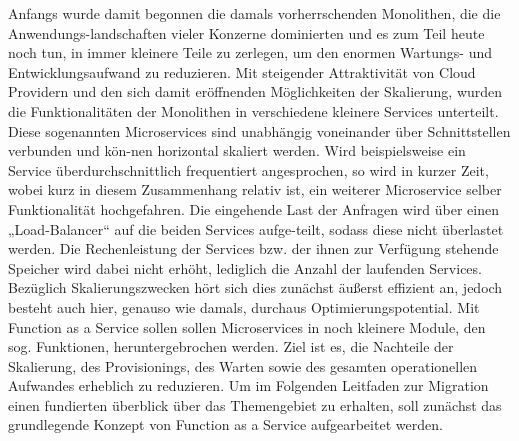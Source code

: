 \documentclass[a4paper,twoside,11pt, pagesize]{scrartcl}
\begin{document}
\begin{spacing}{1.2}
Anfangs wurde damit begonnen die damals vorherrschenden Monolithen, die die Anwendungs-landschaften vieler Konzerne dominierten und es zum Teil heute noch tun, in immer kleinere Teile zu zerlegen, um den enormen Wartungs- und Entwicklungsaufwand zu reduzieren. Mit steigender Attraktivität von Cloud Providern und den sich damit eröffnenden Möglichkeiten der Skalierung, wurden die Funktionalitäten der Monolithen in verschiedene kleinere Services unterteilt. Diese sogenannten Microservices sind unabhängig voneinander über Schnittstellen verbunden und kön-nen horizontal skaliert werden. Wird beispielsweise ein Service überdurchschnittlich frequentiert angesprochen, so wird in kurzer Zeit, wobei kurz in diesem Zusammenhang relativ ist, ein weiterer Microservice selber Funktionalität hochgefahren. Die eingehende Last der Anfragen wird über einen „Load-Balancer“ auf die beiden Services aufge-teilt, sodass diese nicht überlastet werden. Die Rechenleistung der Services bzw. der ihnen zur Verfügung stehende Speicher wird dabei nicht erhöht, lediglich die Anzahl der laufenden Services. Bezüglich Skalierungszwecken hört sich dies zunächst äußerst effizient an, jedoch besteht auch hier, genauso wie damals, durchaus Optimierungspotential. Mit Function as a Service sollen sollen Microservices in noch kleinere Module, den sog. Funktionen, heruntergebrochen werden. Ziel ist es, die Nachteile der Skalierung, des Provisionings, des Warten sowie des gesamten operationellen Aufwandes erheblich zu reduzieren. Um im Folgenden Leitfaden zur Migration einen fundierten überblick über das Themengebiet zu erhalten, soll zunächst das grundlegende Konzept von Function as a Service aufgearbeitet werden.


\end{spacing}
\end{document}

